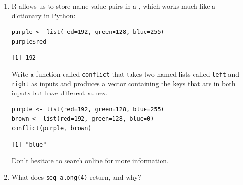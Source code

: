 \begin{enumerate}
\begin{enumerate}
\item
  In Python,
  the expression \texttt{nested[0][0]} will get the first character of the first element of the list.
  What does the equivalent expression \texttt{nested[1][1]} get in R?
  What expression will get the first element's first character?
\end{enumerate}

\item
R allows us to store name-value pairs in a ,
which works much like a dictionary in Python:

\begin{lstlisting}
purple <- list(red=192, green=128, blue=255)
purple$red
\end{lstlisting}

\begin{lstlisting}
[1] 192
\end{lstlisting}

Write a function called \texttt{conflict}
that takes two named lists called \texttt{left} and \texttt{right} as inputs
and produces a vector containing the keys that are in both inputs but have different values:

\begin{lstlisting}
purple <- list(red=192, green=128, blue=255)
brown <- list(red=192, green=128, blue=0)
conflict(purple, brown)
\end{lstlisting}

\begin{lstlisting}
[1] "blue"
\end{lstlisting}

Don't hesitate to search online for more information.

\item
What does \texttt{seq\_along(4)} return, and why?

\end{enumerate}
